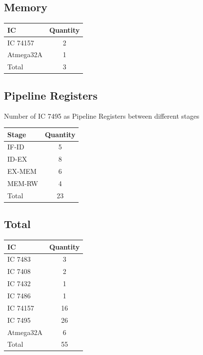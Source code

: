\documentclass[12pt]{article}
\begin{document}
\subsection{Memory}
\begin{table}[H]
    \centering
    \begin{tabular}{lc}
    \textbf{IC} & \textbf{Quantity} \\
    \hline \hline
    IC 74157 & 2 \\
    Atmega32A & 1 \\
    \hline
    Total & 3
\end{tabular}
\end{table}
\newpage
\subsection{Pipeline Registers}
Number of IC 7495 as Pipeline Registers between different stages \\
\begin{table}[H]
    \centering
    \begin{tabular}{lc}
    \textbf{Stage} & \textbf{Quantity} \\
    \hline \hline
    IF-ID & 5 \\
    ID-EX & 8 \\
    EX-MEM & 6 \\
    MEM-RW & 4 \\
    \hline
    Total & 23
\end{tabular}
\end{table}

\subsection{Total}
\begin{table}[h]
    \centering
    \begin{tabular}{lc}
    \textbf{IC} & \textbf{Quantity} \\
    \hline \hline
    IC 7483 & 3 \\
    IC 7408 & 2 \\
    IC 7432 & 1 \\    
    IC 7486 & 1 \\
    IC 74157 & 16 \\    
    IC 7495 & 26 \\
    Atmega32A & 6 \\
    \hline
    Total & 55
\end{tabular}
\end{table}
\end{document}
